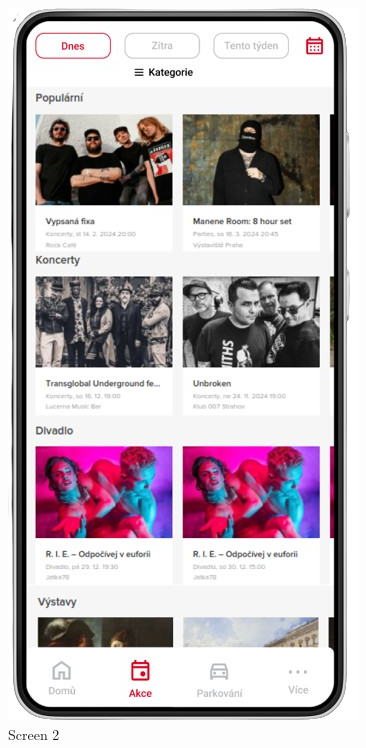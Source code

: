 \begin{figure}[H]
      \includegraphics[width=\linewidth]{screen2.png}
      \caption{Screen 2}\label{fig:screen2}
    \endminipage\hfill
\end{figure}

